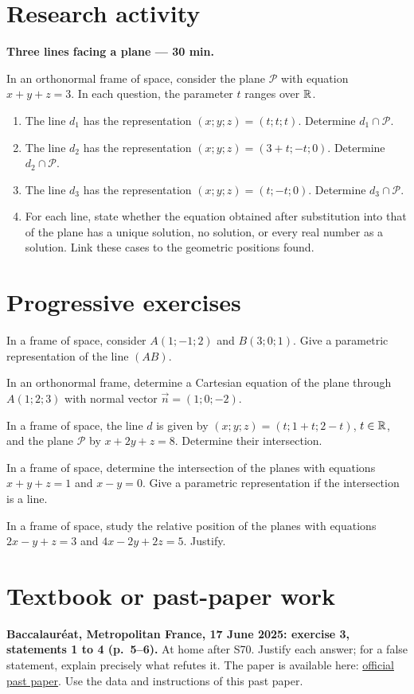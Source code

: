\section{Research activity}\textbf{Three lines facing a plane --- 30 min.}\par In an orthonormal frame of space, consider the plane $\mathcal P$ with equation $x+y+z=3$. In each question, the parameter $t$ ranges over $\mathbb R$.
\begin{enumerate}\item The line $d_1$ has the representation $(x;y;z)=(t;t;t)$. Determine $d_1\cap\mathcal P$.
\item The line $d_2$ has the representation $(x;y;z)=(3+t;-t;0)$. Determine $d_2\cap\mathcal P$.
\item The line $d_3$ has the representation $(x;y;z)=(t;-t;0)$. Determine $d_3\cap\mathcal P$.
\item For each line, state whether the equation obtained after substitution into that of the plane has a unique solution, no solution, or every real number as a solution. Link these cases to the geometric positions found.\end{enumerate}

\section{Progressive exercises}

In a frame of space, consider $A(1;-1;2)$ and $B(3;0;1)$. Give a parametric representation of the line $(AB)$.

In an orthonormal frame, determine a Cartesian equation of the plane through $A(1;2;3)$ with normal vector $\vec n=(1;0;-2)$.

In a frame of space, the line $d$ is given by $(x;y;z)=(t;1+t;2-t)$, $t\in\mathbb R$, and the plane $\mathcal P$ by $x+2y+z=8$. Determine their intersection.

In a frame of space, determine the intersection of the planes with equations $x+y+z=1$ and $x-y=0$. Give a parametric representation if the intersection is a line.

In a frame of space, study the relative position of the planes with equations $2x-y+z=3$ and $4x-2y+2z=5$. Justify.

\section{Textbook or past-paper work}\textbf{Baccalauréat, Metropolitan France, 17 June 2025: exercise 3, statements 1 to 4 (p.~5--6).} At home after S70. Justify each answer; for a false statement, explain precisely what refutes it. The paper is available here: \href{https://www.education.gouv.fr/sites/default/files/2025-06/baccalaur-at-g-n-ral-2025-math-matiques-440856.pdf}{official past paper}. Use the data and instructions of this past paper.

